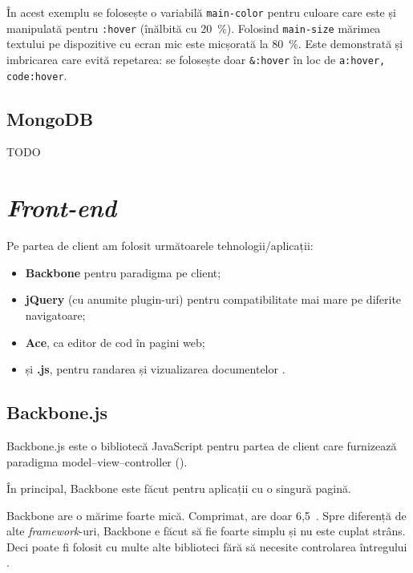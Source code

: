 \documentclass[a4wide,12pt]{report}
\newcommand{\eng}[1]{\emph{#1}} %
\newcommand{\cod}[1]{\texttt{#1}}
\newcommand{\acr}[1]{{\textsmaller[1]{\textsc{#1}}}} %
\newcommand{\idee}[1]{{\color{red} #1}}
\begin{document}
În acest exemplu se folosește o variabilă \cod{main-color} pentru culoare care este și
manipulată pentru \cod{:hover} (înălbită cu 20~\%). Folosind \cod{main-size}
mărimea textului pe dispozitive cu ecran mic este micșorată la 80~\%. Este
demonstrată și imbricarea care evită repetarea: se folosește doar \cod{\&:hover}
în loc de \cod{a:hover, code:hover}.

\subsection{MongoDB}

\idee{TODO}

\section{\eng{Front-end}}

Pe partea de client am folosit următoarele tehnologii/aplicații:

\begin{itemize}

\item \textbf{Backbone} pentru paradigma \acr{MVC} pe client;

\item \textbf{jQuery} (cu anumite plugin-uri) pentru compatibilitate mai mare pe
diferite navigatoare;

\item \textbf{Ace}, ca editor de cod în pagini web;

\item și \textbf{\acr{PDF}.js}, pentru randarea și vizualizarea documentelor
\acr{PDF}.

\end{itemize}

\subsection{Backbone.js}

Backbone.js\cite{backbone} este o bibliotecă JavaScript pentru partea de client
care furnizează paradigma model--view--controller (\acr{MVC}).

În principal, Backbone este făcut pentru aplicații cu o singură pagină.

Backbone are o mărime foarte mică. Comprimat, are doar 6,5~\acr{KiB}. Spre
diferență de alte \eng{framework}-uri, Backbone e făcut să fie foarte simplu și
nu este cuplat strâns. Deci poate fi folosit cu multe alte biblioteci fără să
necesite controlarea întregului \acr{DOM}.
\end{document}
